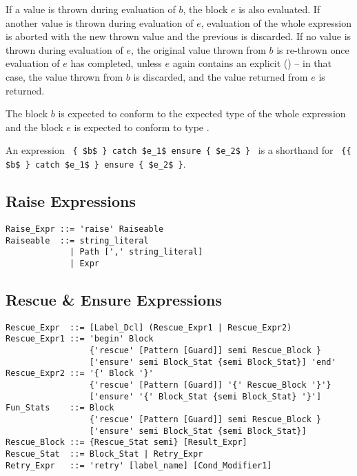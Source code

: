 If a value is thrown during evaluation of $b$, the  block $e$ is also evaluated. If another value is thrown during evaluation of $e$, evaluation of the whole expression is aborted with the new thrown value and the previous is discarded. If no value is thrown during evaluation of $e$, the original value thrown from $b$ is re-thrown once evaluation of $e$ has completed, unless $e$ again contains an explicit  () -- in that case, the value thrown from $b$ is discarded, and the value returned from $e$ is returned. 


The block $b$ is expected to conform to the expected type of the whole expression and the  block $e$ is expected to conform to type . 

An expression ~\lstinline!{ $b$ } catch $e_1$ ensure { $e_2$ }!~ is a shorthand for ~\lstinline!{{ $b$ } catch $e_1$ } ensure { $e_2$ }!. 





\subsection{Raise Expressions}

\syntax\begin{lstlisting}
Raise_Expr ::= 'raise' Raiseable
Raiseable  ::= string_literal
             | Path [',' string_literal]
             | Expr
\end{lstlisting}






\subsection{Rescue \& Ensure Expressions}

\syntax\begin{lstlisting}
Rescue_Expr  ::= [Label_Dcl] (Rescue_Expr1 | Rescue_Expr2)
Rescue_Expr1 ::= 'begin' Block 
                 {'rescue' [Pattern [Guard]] semi Rescue_Block }
                 ['ensure' semi Block_Stat {semi Block_Stat}] 'end'
Rescue_Expr2 ::= '{' Block '}' 
                 {'rescue' [Pattern [Guard]] '{' Rescue_Block '}'}
                 ['ensure' '{' Block_Stat {semi Block_Stat} '}']
Fun_Stats    ::= Block
                 {'rescue' [Pattern [Guard]] semi Rescue_Block }
                 ['ensure' semi Block_Stat {semi Block_Stat}]
Rescue_Block ::= {Rescue_Stat semi} [Result_Expr]
Rescue_Stat  ::= Block_Stat | Retry_Expr
Retry_Expr   ::= 'retry' [label_name] [Cond_Modifier1]
\end{lstlisting}






